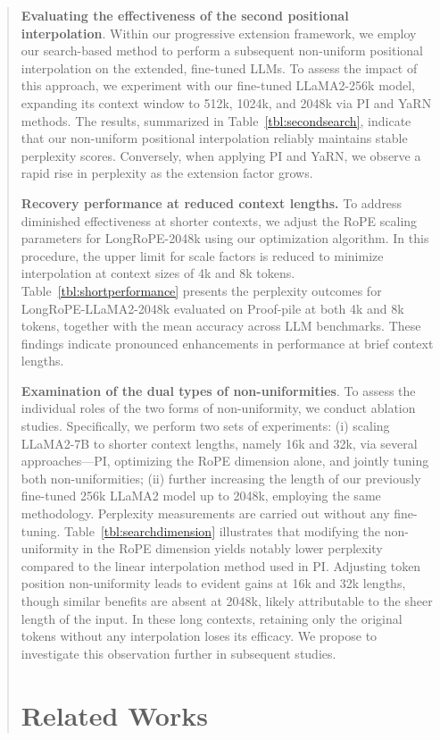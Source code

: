 \begin{abstract}
\textbf{Evaluating the effectiveness of the second positional interpolation}. Within our progressive extension framework, we employ our search-based method to perform a subsequent non-uniform positional interpolation on the extended, fine-tuned LLMs. To assess the impact of this approach, we experiment with our fine-tuned LLaMA2-256k model, expanding its context window to 512k, 1024k, and 2048k via PI and YaRN methods. The results, summarized in Table~\ref{tbl:secondsearch}, indicate that our non-uniform positional interpolation reliably maintains stable perplexity scores. Conversely, when applying PI and YaRN, we observe a rapid rise in perplexity as the extension factor grows.

\textbf{Recovery performance at reduced context lengths.} To address diminished effectiveness at shorter contexts, we adjust the RoPE scaling parameters for LongRoPE-2048k using our optimization algorithm. In this procedure, the upper limit for scale factors is reduced to minimize interpolation at context sizes of 4k and 8k tokens. Table~\ref{tbl:shortperformance} presents the perplexity outcomes for LongRoPE-LLaMA2-2048k evaluated on Proof-pile at both 4k and 8k tokens, together with the mean accuracy across LLM benchmarks. These findings indicate pronounced enhancements in performance at brief context lengths.

\textbf{Examination of the dual types of non-uniformities}. To assess the individual roles of the two forms of non-uniformity, we conduct ablation studies. Specifically, we perform two sets of experiments: (i) scaling LLaMA2-7B to shorter context lengths, namely 16k and 32k, via several approaches—PI, optimizing the RoPE dimension alone, and jointly tuning both non-uniformities; (ii) further increasing the length of our previously fine-tuned 256k LLaMA2 model up to 2048k, employing the same methodology. Perplexity measurements are carried out without any fine-tuning. Table~\ref{tbl:searchdimension} illustrates that modifying the non-uniformity in the RoPE dimension yields notably lower perplexity compared to the linear interpolation method used in PI. Adjusting token position non-uniformity leads to evident gains at 16k and 32k lengths, though similar benefits are absent at 2048k, likely attributable to the sheer length of the input. In these long contexts, retaining only the original tokens without any interpolation loses its efficacy. We propose to investigate this observation further in subsequent studies.

\section{Related Works}


\end{abstract}
